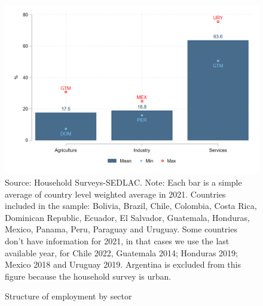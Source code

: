 \documentclass[english]{article}
\begin{document}
\begin{itemize}
\begin{figure}[!htb]
        \justifying
        \caption{Structure of employment by sector}     
        \includegraphics[scale=.3]{latex/figures/Snapshot/Structure of employment and sector.png}
        \label{fig:sector}
       \footnotesize{Source: Household Surveys-SEDLAC.}
        \footnotesize{Note: Each bar is a simple average of country level weighted average in 2021. Countries included in the sample: Bolivia, Brazil, Chile, Colombia, Costa Rica, Dominican Republic, Ecuador, El Salvador, Guatemala, Honduras, Mexico, Panama, Peru, Paraguay and Uruguay. Some countries don’t have information for 2021, in that cases we use the last available year, for Chile 2022, Guatemala 2014; Honduras 2019; Mexico 2018 and Uruguay 2019. Argentina is excluded from this figure because the household survey is urban.}
\end{figure}


\end{itemize}
\end{document}
